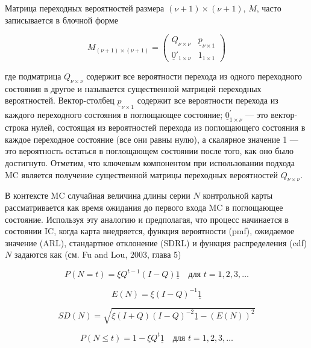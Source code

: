 Матрица переходных вероятностей размера \((\nu + 1) \times (\nu + 1)\), \(M\), часто записывается в блочной форме

\begin{equation}
	M_{(\nu+1)\times(\nu+1)} = 
	\left(
	\begin{array}{c|c}
		Q_{\nu\times\nu} & \underline{p}_{\nu\times1} \\
		\hline
		\underline{0}'_{1\times\nu} & 1_{1\times1}
	\end{array}
	\right)
	\label{eq:3.20}
\end{equation}

где подматрица \(Q_{\nu \times \nu}\) содержит все вероятности перехода из одного переходного состояния в другое и называется существенной матрицей переходных вероятностей. Вектор-столбец \(\underline{p}_{\nu \times 1}\) содержит все вероятности перехода из каждого переходного состояния в поглощающее состояние; \(\underline{0}_{1 \times \nu}^{\prime}\) — это вектор-строка нулей, состоящая из вероятностей перехода из поглощающего состояния в каждое переходное состояние (все они равны нулю), а скалярное значение 1 — это вероятность остаться в поглощающем состоянии после того, как оно было достигнуто. Отметим, что ключевым компонентом при использовании подхода MC является получение существенной матрицы переходных вероятностей \(Q_{\nu \times \nu}\).

В контексте MC случайная величина длины серии \(N\) контрольной карты рассматривается как время ожидания до первого входа MC в поглощающее состояние. Используя эту аналогию и предполагая, что процесс начинается в состоянии IC, когда карта внедряется, функция вероятности (pmf), ожидаемое значение (ARL), стандартное отклонение (SDRL) и функция распределения (cdf) \(N\) задаются как (см. Fu and Lou, 2003, глава 5)

\begin{equation}
	P(N = t) = \xi Q^{t-1}(I - Q)\underline{1} \quad \text{для } t = 1, 2, 3, \ldots
	\label{eq:3.21}
\end{equation}

\begin{equation}
	E(N) = \xi (I - Q)^{-1}\underline{1}
	\label{eq:3.22}
\end{equation}

\begin{equation}
	SD(N) = \sqrt{\xi(I + Q)(I - Q)^{-2}\underline{1} - (E(N))^{2}}
	\label{eq:3.23}
\end{equation}

\begin{equation}
	P(N \leq t) = 1 - \xi Q^{t}\underline{1} \quad \text{для } t = 1, 2, 3, \ldots
	\label{eq:3.24}
\end{equation}

